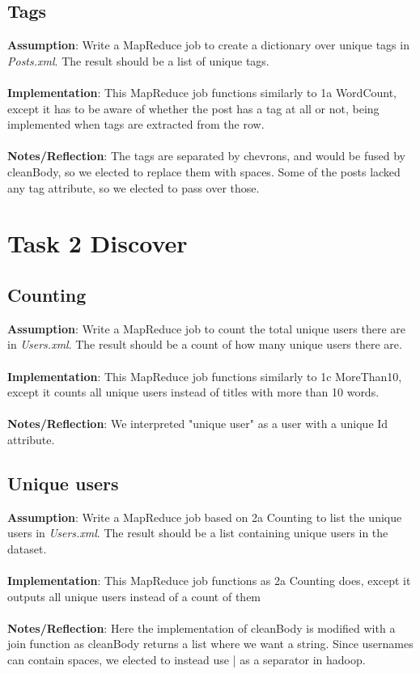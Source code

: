 \documentclass[fleqn,10pt]{wlscirep}
\begin{document}
\subsection{Tags}
\textbf{Assumption}: Write a MapReduce job to create a dictionary over unique tags in \textit{Posts.xml}. The result should be a list of unique tags.\\ \\
\textbf{Implementation}: This MapReduce job functions similarly to 1a WordCount, except it has to be aware of whether the post has a tag at all or not, being implemented when tags are extracted from the row. \\ \\
\textbf{Notes/Reflection}: The tags are separated by chevrons, and would be fused by cleanBody, so we elected to replace them with spaces. Some of the posts lacked any tag attribute, so we elected to pass over those.



\section{Task 2 Discover}

\subsection{Counting}
\textbf{Assumption}: Write a MapReduce job to count the total unique users there are in \textit{Users.xml}. The result should be a count of how many unique users there are.\\ \\
\textbf{Implementation}: This MapReduce job functions similarly to 1c MoreThan10, except it counts all unique users instead of titles with more than 10 words. \\ \\
\textbf{Notes/Reflection}: We interpreted "unique user" as a user with a unique Id attribute.


\subsection{Unique users}
\textbf{Assumption}: Write a MapReduce job based on 2a Counting to list the unique users in \textit{Users.xml}. The result should be a list containing unique users in the dataset. \\ \\
\textbf{Implementation}: This MapReduce job functions as 2a Counting does, except it outputs all unique users instead of a count of them \\ \\
\textbf{Notes/Reflection}: Here the implementation of cleanBody is modified with a join function as cleanBody returns a list where we want a string. Since usernames can contain spaces, we elected to instead use | as a separator in hadoop.
 
\end{document}

